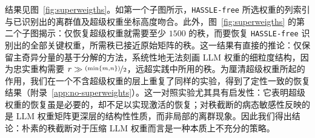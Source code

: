 结果见图~\ref{fig:superweigths}。如第一个子图所示，\texttt{HASSLE-free} 所选权重的列索引与已识别出的离群值及超级权重坐标高度吻合。此外，图~\ref{fig:superweigths} 的第二个子图揭示：仅恢复超级权重就需要至少 $1500$ 的秩，而要恢复 \texttt{HASSLE-free} 识别出的全部关键权重，所需秩已接近原始矩阵的秩。这一结果有直接的推论：仅保留主奇异分量的基于分解的方法，系统性地无法刻画 LLM 权重的细粒度结构，因为忠实重构需要 $r \gg \nicefrac{(\min \{m, n\})}{2}$，远超实践中所用的秩。为厘清超级权重所起的作用，我们在一个不含超级权重的层上重复了同样的实验，得到了定性一致的恢复结果（附录~\ref{app:no-superweights}）。这一对照实验尤其具有启发性：它表明超级权重的恢复虽是必要的，却不足以实现激活的恢复；对秩截断的病态敏感性反映的是 LLM 权重矩阵更深层的结构性性质，而非局部的离群现象。因此我们得出结论：朴素的秩截断对于压缩 LLM 权重而言是一种本质上不充分的策略。


